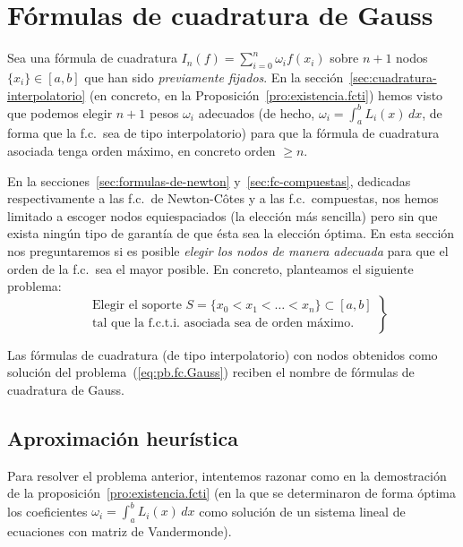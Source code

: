 \section{Fórmulas de cuadratura de Gauss}
\label{sec:fc-Gauss}
Sea una fórmula de cuadratura $I_n(f)=\sum_{i=0}^n \omega_i f(x_i)$
sobre $n+1$ nodos $\{x_i\}\in [a,b]$ que han sido \textit{previamente
  fijados}. En la sección~\ref{sec:cuadratura-interpolatorio} (en
concreto, en la Proposición~\ref{pro:existencia.fcti}) hemos visto que
podemos elegir $n+1$ pesos $\omega_i$ adecuados (de hecho,
$\omega_i=\int_a^b L_i(x)\, dx$, de forma que la f.c.\ sea de tipo
interpolatorio) para que la fórmula de cuadratura asociada tenga orden
máximo, en concreto orden $\ge n$.

En la secciones~\ref{sec:formulas-de-newton}
y~\ref{sec:fc-compuestas}, dedicadas respectivamente a las f.c.\ de
Newton-Côtes y a las f.c.\ compuestas, nos hemos limitado a escoger
nodos equiespaciados (la elección más sencilla) pero sin que exista
ningún tipo de garantía de que ésta sea la elección óptima. En esta
sección nos preguntaremos si es posible \textit{elegir los nodos de manera
adecuada} para que el orden de la f.c.\ sea el mayor posible. En
concreto, planteamos el siguiente problema:
\begin{equation}
\label{eq:pb.fc.Gauss}
\tag{P}
\left.
  \begin{aligned}
    &\text{Elegir el soporte $S=\{x_0<x_1<\dots<x_n\}\subset [a,b]$}
    \\
    &\text{tal que la f.c.t.i. asociada sea de orden máximo.}
  \end{aligned}
\right\}
\end{equation}

\begin{definition}
  Las fórmulas de cuadratura (de tipo interpolatorio) con nodos
  obtenidos como solución del problema~(\ref{eq:pb.fc.Gauss}) reciben
  el nombre de fórmulas de cuadratura de Gauss.
\end{definition}
\subsection*{Aproximación heurística}
Para resolver el problema anterior, intentemos razonar como en la
demostración de la proposición~\ref{pro:existencia.fcti} (en la que se
determinaron de forma óptima los coeficientes $\omega_i=\int_a^b
L_i(x)\, dx$ como solución de un sistema lineal de ecuaciones con
matriz de Vandermonde).


